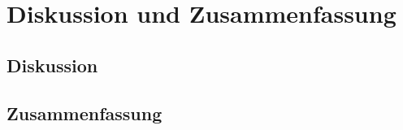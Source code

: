 \documentclass[12pt,english,ngerman]{scrartcl}
\begin{document}
\section{Diskussion und Zusammenfassung}\label{sec:Diskussion} 
\subsection{Diskussion}


\subsection{Zusammenfassung}

\newpage

\printbibliography

\listoffigures

\listoftables
\end{document}
